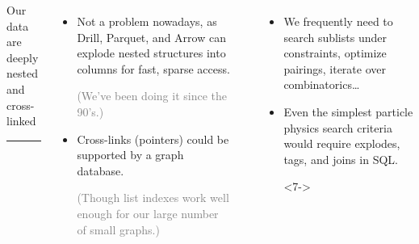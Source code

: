 \documentclass[aspectratio=169]{beamer}
\begin{document}
\begin{frame}
\vspace{0.5 cm}
\begin{columns}[t]
\begin{center}
\Large Our data are deeply nested \\ and cross-linked

\vspace{-0.25 cm}
\rule{\linewidth}{0.8 pt}
\end{center}

\vspace{-0.25 cm}
\begin{itemize}\setlength{\itemsep}{0.5 cm}
\item<2-> Not a problem nowadays, as Drill, Parquet, and Arrow can explode nested structures into columns for fast, sparse access.

\vspace{0.2 cm}
\textcolor{gray}{(We've been doing it since the 90's.)}

\item<3-> Cross-links (pointers) could be supported by a graph database.

\vspace{0.2 cm}
\textcolor{gray}{(Though list indexes work well enough for our large number of small graphs.)}

\end{itemize}

\begin{center}

\vspace{-0.25 cm}
\end{center}

\vspace{-0.25 cm}
\begin{itemize}
\item<5-> We frequently need to search sublists under constraints, optimize pairings, iterate over combinatorics\ldots

\item<6-> Even the simplest particle physics search criteria would require explodes, tags, and joins in SQL.

\vspace{0.5 cm}
\begin{uncoverenv}<7->
\end{uncoverenv}
\end{itemize}
\end{columns}
\end{frame}
\end{document}
